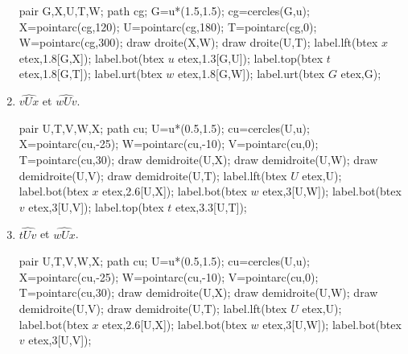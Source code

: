 \begin{exercice*}
\begin{multicols}{2}
\begin{enumerate}
\begin{Geometrie}[CoinHD={(4u,3.5u)}]
                pair G,X,U,T,W;
                path cg;
                G=u*(1.5,1.5);
                cg=cercles(G,u);
                X=pointarc(cg,120);
                U=pointarc(cg,180);
                T=pointarc(cg,0);
                W=pointarc(cg,300);
                draw droite(X,W);
                draw droite(U,T);
                label.lft(btex $x$ etex,1.8[G,X]);
                label.bot(btex $u$ etex,1.3[G,U]);
                label.top(btex $t$ etex,1.8[G,T]);
                label.urt(btex $w$ etex,1.8[G,W]);
                label.urt(btex $G$ etex,G);
            \end{Geometrie}
            \columnbreak
            \item $\widehat{vUx}$ et $\widehat{wUv}$.\par
            \hspace*{-5mm}
            \begin{Geometrie}[CoinHD={(4u,3.5u)}]
                pair U,T,V,W,X;
                path cu;
                U=u*(0.5,1.5);
                cu=cercles(U,u);
                X=pointarc(cu,-25);
                W=pointarc(cu,-10);
                V=pointarc(cu,0);
                T=pointarc(cu,30);
                draw demidroite(U,X);
                draw demidroite(U,W);
                draw demidroite(U,V);
                draw demidroite(U,T);
                label.lft(btex $U$ etex,U);
                label.bot(btex $x$ etex,2.6[U,X]);            
                label.bot(btex $w$ etex,3[U,W]);
                label.bot(btex $v$ etex,3[U,V]);
                label.top(btex $t$ etex,3.3[U,T]);            
            \end{Geometrie}
            \item $\widehat{tUv}$ et $\widehat{wUx}$.\par
            \hspace*{-5mm}
            \begin{Geometrie}[CoinHD={(4u,3.5u)}]
                pair U,T,V,W,X;
                path cu;
                U=u*(0.5,1.5);
                cu=cercles(U,u);
                X=pointarc(cu,-25);
                W=pointarc(cu,-10);
                V=pointarc(cu,0);
                T=pointarc(cu,30);
                draw demidroite(U,X);
                draw demidroite(U,W);
                draw demidroite(U,V);
                draw demidroite(U,T);
                label.lft(btex $U$ etex,U);
                label.bot(btex $x$ etex,2.6[U,X]);            
                label.bot(btex $w$ etex,3[U,W]);
                label.bot(btex $v$ etex,3[U,V]);

\end{Geometrie}
\end{enumerate}
\end{multicols}
\end{exercice*}
